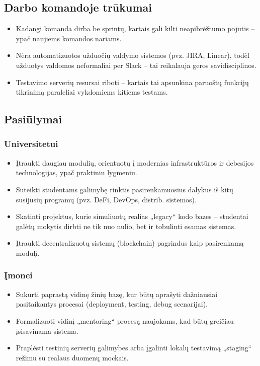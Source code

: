 \documentclass[]{VUMIFTemplateClass}
\begin{document}
\subsection{Darbo komandoje trūkumai}

\begin{itemize}
    \item Kadangi komanda dirba be sprintų, kartais gali kilti neapibrėžtumo pojūtis – ypač naujiems komandos nariams.
    \item Nėra automatizuotos užduočių valdymo sistemos (pvz. JIRA, Linear), todėl užduotys valdomos neformaliai per Slack – tai reikalauja geros savidisciplinos.
    \item Testavimo serverių resursai riboti – kartais tai apsunkina paruoštų funkcijų tikrinimą paraleliai vykdomiems kitiems testams.
\end{itemize}

\subsection{Pasiūlymai}

\subsubsection{Universitetui}

\begin{itemize}
    \item Įtraukti daugiau modulių, orientuotų į modernias infrastruktūros ir debesijos technologijas, ypač praktiniu lygmeniu.
    \item Suteikti studentams galimybę rinktis pasirenkamuosius dalykus iš kitų susijusių programų (pvz. DeFi, DevOps, distrib. sistemos).
    \item Skatinti projektus, kurie simuliuotų realias „legacy“ kodo bazes – studentai galėtų mokytis dirbti ne tik nuo nulio, bet ir tobulinti esamas sistemas.
    \item Įtraukti decentralizuotų sistemų (blockchain) pagrindus kaip pasirenkamą modulį.
\end{itemize}

\subsubsection{Įmonei}

\begin{itemize}
    \item Sukurti paprastą vidinę žinių bazę, kur būtų aprašyti dažniausiai pasitaikantys procesai (deployment, testing, debug scenarijai).
    \item Formalizuoti vidinį „mentoring“ procesą naujokams, kad būtų greičiau įsisavinama sistema.
    \item Praplėsti testinių serverių galimybes arba įgalinti lokalų testavimą „staging“ režimu su realaus duomenų mockais.
\end{itemize}
\end{document}
